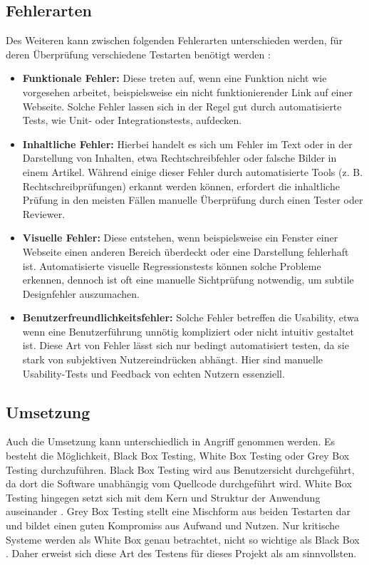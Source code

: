 \documentclass[a4paper,12pt]{article}
\begin{document}
\subsection{Fehlerarten}
Des Weiteren kann zwischen folgenden Fehlerarten unterschieden werden, für deren Überprüfung verschiedene Testarten benötigt werden \cite{eichstadt_testen_2024}:
\begin{itemize}
    \item \textbf{Funktionale Fehler:} Diese treten auf, wenn eine Funktion nicht wie vorgesehen arbeitet, beispielsweise ein nicht funktionierender Link auf einer Webseite. Solche Fehler lassen sich in der Regel gut durch automatisierte Tests, wie Unit- oder Integrationstests, aufdecken.
    \item \textbf{Inhaltliche Fehler:} Hierbei handelt es sich um Fehler im Text oder in der Darstellung von Inhalten, etwa Rechtschreibfehler oder falsche Bilder in einem Artikel. Während einige dieser Fehler durch automatisierte Tools (z. B. Rechtschreibprüfungen) erkannt werden können, erfordert die inhaltliche Prüfung in den meisten Fällen manuelle Überprüfung durch einen Tester oder Reviewer.
    \item \textbf{Visuelle Fehler:} Diese entstehen, wenn beispielsweise ein Fenster einer Webseite einen anderen Bereich überdeckt oder eine Darstellung fehlerhaft ist. Automatisierte visuelle Regressionstests können solche Probleme erkennen, dennoch ist oft eine manuelle Sichtprüfung notwendig, um subtile Designfehler auszumachen.
    \item \textbf{Benutzerfreundlichkeitsfehler:} Solche Fehler betreffen die Usability, etwa wenn eine Benutzerführung unnötig kompliziert oder nicht intuitiv gestaltet ist. Diese Art von Fehler lässt sich nur bedingt automatisiert testen, da sie stark von subjektiven Nutzereindrücken abhängt. Hier sind manuelle Usability-Tests und Feedback von echten Nutzern essenziell.
\end{itemize}

\subsection{Umsetzung}
Auch die Umsetzung kann unterschiedlich in Angriff genommen werden. Es besteht die Möglichkeit, Black Box Testing, White Box Testing oder Grey Box Testing durchzuführen. Black Box Testing wird aus Benutzersicht durchgeführt, da dort die Software unabhängig vom Quellcode durchgeführt wird. White Box Testing hingegen setzt sich mit dem Kern und Struktur der Anwendung auseinander \cite{gedik_schwarz_2023}. Grey Box Testing stellt eine Mischform aus beiden Testarten dar und bildet einen guten Kompromiss aus Aufwand und Nutzen. Nur kritische Systeme werden als White Box genau betrachtet, nicht so wichtige als Black Box \cite{eichstadt_testen_2024}. Daher erweist sich diese Art des Testens für dieses Projekt als am sinnvollsten.
\end{document}
